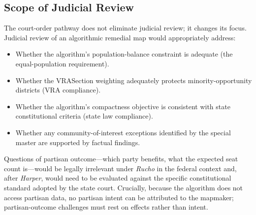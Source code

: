 \subsection{Scope of Judicial Review}

The court-order pathway does not eliminate judicial review; it changes its
focus.  Judicial review of an algorithmic remedial map would appropriately
address:
\begin{itemize}
  \item Whether the algorithm's population-balance constraint is adequate
    (the equal-population requirement).
  \item Whether the VRASection weighting adequately protects minority-opportunity
    districts (VRA compliance).
  \item Whether the algorithm's compactness objective is consistent with
    state constitutional criteria (state law compliance).
  \item Whether any community-of-interest exceptions identified by the special
    master are supported by factual findings.
\end{itemize}

Questions of partisan outcome---which party benefits, what the expected seat
count is---would be legally irrelevant under \textit{Rucho} in the federal
context and, after \textit{Harper}, would need to be evaluated against the
specific constitutional standard adopted by the state court.  Crucially,
because the algorithm does not access partisan data, no partisan intent can be
attributed to the mapmaker; partisan-outcome challenges must rest on effects
rather than intent.
